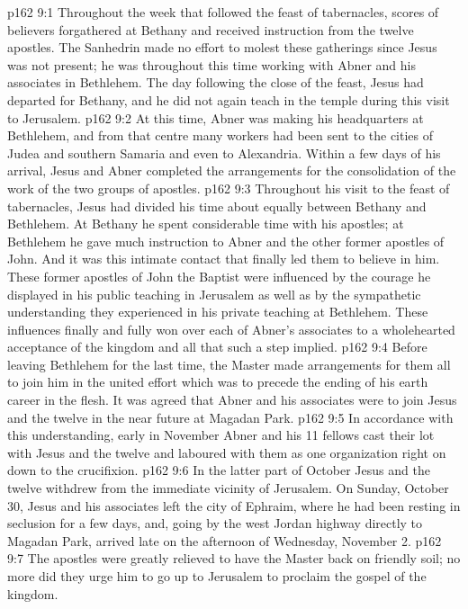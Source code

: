\vs p162 9:1 Throughout the week that followed the feast of tabernacles, scores of believers forgathered at Bethany and received instruction from the twelve apostles. The Sanhedrin made no effort to molest these gatherings since Jesus was not present; he was throughout this time working with Abner and his associates in Bethlehem. The day following the close of the feast, Jesus had departed for Bethany, and he did not again teach in the temple during this visit to Jerusalem.
\vs p162 9:2 \pc At this time, Abner was making his headquarters at Bethlehem, and from that centre many workers had been sent to the cities of Judea and southern Samaria and even to Alexandria. Within a few days of his arrival, Jesus and Abner completed the arrangements for the consolidation of the work of the two groups of apostles.
\vs p162 9:3 Throughout his visit to the feast of tabernacles, Jesus had divided his time about equally between Bethany and Bethlehem. At Bethany he spent considerable time with his apostles; at Bethlehem he gave much instruction to Abner and the other former apostles of John. And it was this intimate contact that finally led them to believe in him. These former apostles of John the Baptist were influenced by the courage he displayed in his public teaching in Jerusalem as well as by the sympathetic understanding they experienced in his private teaching at Bethlehem. These influences finally and fully won over each of Abner’s associates to a wholehearted acceptance of the kingdom and all that such a step implied.
\vs p162 9:4 \pc Before leaving Bethlehem for the last time, the Master made arrangements for them all to join him in the united effort which was to precede the ending of his earth career in the flesh. It was agreed that Abner and his associates were to join Jesus and the twelve in the near future at Magadan Park.
\vs p162 9:5 In accordance with this understanding, early in November Abner and his 11 fellows cast their lot with Jesus and the twelve and laboured with them as one organization right on down to the crucifixion.
\vs p162 9:6 In the latter part of October Jesus and the twelve withdrew from the immediate vicinity of Jerusalem. On Sunday, October 30, Jesus and his associates left the city of Ephraim, where he had been resting in seclusion for a few days, and, going by the west Jordan highway directly to Magadan Park, arrived late on the afternoon of Wednesday, November 2.
\vs p162 9:7 The apostles were greatly relieved to have the Master back on friendly soil; no more did they urge him to go up to Jerusalem to proclaim the gospel of the kingdom.
\quizlink

